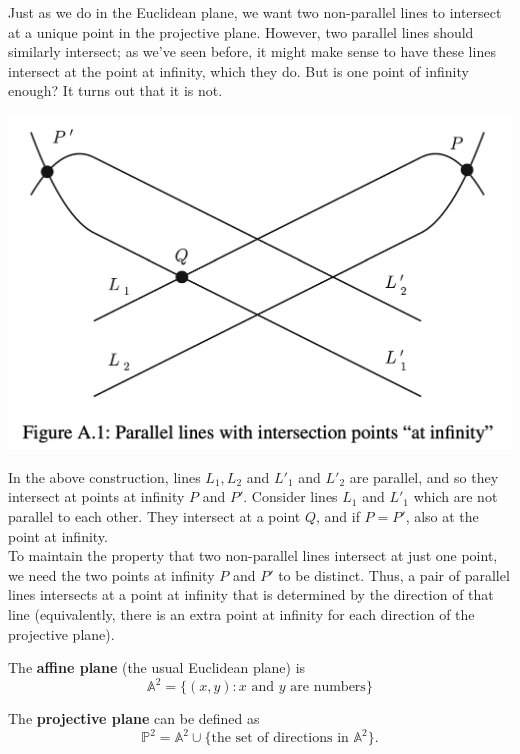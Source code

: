 \documentclass[11pt]{article}
\begin{document}
Just as we do in the Euclidean plane, we want two non-parallel lines to intersect at a unique point in the projective plane. However, two parallel lines should similarly intersect; as we've seen before, it might make sense to have these lines intersect at the point at infinity, which they do. But is one point of infinity enough? It turns out that it is not. 
\begin{center}
    \includegraphics[scale=0.5]{ProjectiveLineIntersection.png}
\end{center}

In the above construction, lines $L_1, L_2$ and $L'_1$ and $L'_2$ are parallel, and so they intersect at points at infinity $P$ and $P'$. Consider lines $L_1$ and $L'_1$ which are not parallel to each other. They intersect at a point $Q$, and if $P = P'$, also at the point at infinity. \\

To maintain the property that two non-parallel lines intersect at just one point, we need the two points at infinity $P$ and $P'$ to be distinct. Thus, a pair of parallel lines intersects at a point at infinity that is determined by the direction of that line (equivalently, there is an extra point at infinity for each direction of the projective plane). \\

\begin{definition} The \textbf{affine plane} (the usual Euclidean plane) is
\[ \mathbb{A}^2 = \{ (x, y): x \text{ and } y \text{ are numbers} \}\]

The \textbf{projective plane} can be defined as
\[\mathbb{P}^2 = \mathbb{A}^2 \cup \{\text{the set of directions in } \mathbb{A}^2 \}.\]
\end{definition}
\end{document}
